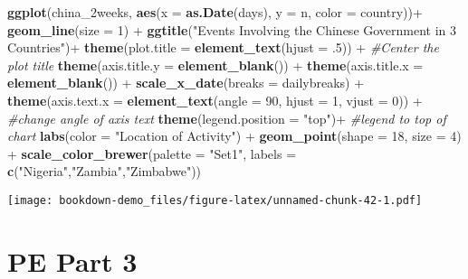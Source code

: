 \documentclass[]{book}
\newenvironment{Shaded}{\begin{snugshade}}{\end{snugshade}}
\newcommand{\KeywordTok}[1]{\textcolor[rgb]{0.13,0.29,0.53}{\textbf{{#1}}}}
\newcommand{\DataTypeTok}[1]{\textcolor[rgb]{0.13,0.29,0.53}{{#1}}}
\newcommand{\DecValTok}[1]{\textcolor[rgb]{0.00,0.00,0.81}{{#1}}}
\newcommand{\StringTok}[1]{\textcolor[rgb]{0.31,0.60,0.02}{{#1}}}
\newcommand{\CommentTok}[1]{\textcolor[rgb]{0.56,0.35,0.01}{\textit{{#1}}}}
\newcommand{\NormalTok}[1]{{#1}}
\theoremstyle{definition}
\theoremstyle{definition}
\theoremstyle{remark}
\begin{document}
\begin{Shaded}
\begin{Highlighting}[]
\KeywordTok{ggplot}\NormalTok{(china_2weeks, }\KeywordTok{aes}\NormalTok{(}\DataTypeTok{x =} \KeywordTok{as.Date}\NormalTok{(days), }\DataTypeTok{y =} \NormalTok{n, }\DataTypeTok{color =} \NormalTok{country))+}
\StringTok{  }\KeywordTok{geom_line}\NormalTok{(}\DataTypeTok{size =} \DecValTok{1}\NormalTok{) +}
\StringTok{  }\KeywordTok{ggtitle}\NormalTok{(}\StringTok{"Events Involving the Chinese Government in 3 Countries"}\NormalTok{)+}
\StringTok{  }\KeywordTok{theme}\NormalTok{(}\DataTypeTok{plot.title =} \KeywordTok{element_text}\NormalTok{(}\DataTypeTok{hjust =} \NormalTok{.}\DecValTok{5}\NormalTok{)) +}\StringTok{  }\CommentTok{#Center the plot title}
\StringTok{  }\KeywordTok{theme}\NormalTok{(}\DataTypeTok{axis.title.y =} \KeywordTok{element_blank}\NormalTok{()) +}
\StringTok{  }\KeywordTok{theme}\NormalTok{(}\DataTypeTok{axis.title.x =} \KeywordTok{element_blank}\NormalTok{()) +}
\StringTok{  }\KeywordTok{scale_x_date}\NormalTok{(}\DataTypeTok{breaks =} \NormalTok{dailybreaks) +}
\StringTok{  }\KeywordTok{theme}\NormalTok{(}\DataTypeTok{axis.text.x =} \KeywordTok{element_text}\NormalTok{(}\DataTypeTok{angle =} \DecValTok{90}\NormalTok{, }\DataTypeTok{hjust =} \DecValTok{1}\NormalTok{, }\DataTypeTok{vjust =} \DecValTok{0}\NormalTok{)) +}\StringTok{  }\CommentTok{#change angle of axis text}
\StringTok{  }\KeywordTok{theme}\NormalTok{(}\DataTypeTok{legend.position =} \StringTok{"top"}\NormalTok{)+}\StringTok{  }\CommentTok{#legend to top of chart}
\StringTok{  }\KeywordTok{labs}\NormalTok{(}\DataTypeTok{color =} \StringTok{"Location of Activity"}\NormalTok{) +}
\StringTok{  }\KeywordTok{geom_point}\NormalTok{(}\DataTypeTok{shape =} \DecValTok{18}\NormalTok{, }\DataTypeTok{size =} \DecValTok{4}\NormalTok{) +}
\StringTok{  }\KeywordTok{scale_color_brewer}\NormalTok{(}\DataTypeTok{palette =} \StringTok{"Set1"}\NormalTok{, }\DataTypeTok{labels =} \KeywordTok{c}\NormalTok{(}\StringTok{"Nigeria"}\NormalTok{,}\StringTok{"Zambia"}\NormalTok{,}\StringTok{"Zimbabwe"}\NormalTok{))}
\end{Highlighting}
\end{Shaded}

\texttt{[image: bookdown-demo\_files/figure-latex/unnamed-chunk-42-1.pdf]}

\section{PE Part 3}\label{pe-part-3}
\end{document}
